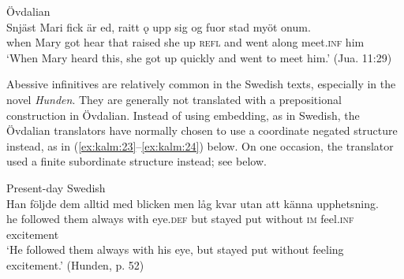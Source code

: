 \documentclass[output=paper]{langscibook}
\begin{document}
\ex Övdalian\label{ex:kalm:22b}\\ 
\gll Snjäst Mari fick är ed, raitt ǫ upp sig og fuor stad myöt onum.\\
when Mary got hear that raised she up \textsc{refl} and went along meet.\textsc{inf} him\\
\glt ‘When Mary heard this, she got up quickly and went to meet him.’ (Jua. 11:29)
\z 
\z 


Abessive infinitives are relatively common in the Swedish texts, especially in the novel \textit{Hunden}. They are generally not translated with a prepositional construction in Övdalian. Instead of using embedding, as in Swedish, the Övdalian translators have normally chosen to use a coordinate negated structure instead, as in (\ref{ex:kalm:23}--\ref{ex:kalm:24}) below. On one occasion, the translator used a finite subordinate structure instead; see  below.


\ea
\label{ex:kalm:23}
\ea Present-day Swedish\label{ex:kalm:23a}\\
\gll Han följde dem alltid med blicken men låg kvar utan att känna upphetsning.\\
he followed them always with eye.\textsc{def} but stayed put without \textsc{im} feel.\textsc{inf} excitement\\
\glt ‘He followed them always with his eye, but stayed put without feeling excitement.’ (Hunden, p. 52)\\
\end{document}

